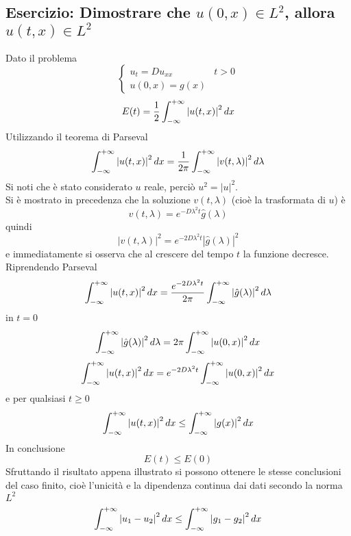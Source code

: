 \subsection{\texorpdfstring
{Esercizio: Dimostrare che $u(0,x) \in L^2$, allora $u(t,x) \in L^2$}
{Esercizio: Dimostrare che se u(0,x) \`e a quadrato sommabile,
allora lo \`e anche u(t,x)}}
Dato il problema
\[
	\left\{
	\begin{array}{ll}
		u_t=Du_{xx} & t>0\\
		u(0,x)= g(x)
	\end{array}
	\right.
\]
\[
	E(t)= \frac{1}{2}\int_{- \infty}^{+ \infty} \left| u(t,x)\right|^2 dx
\]
Utilizzando il teorema di Parseval
\[
	\int_{- \infty}^{+ \infty} \left| u(t,x)\right|^2dx
	= \frac{1}{2\pi} \int_{- \infty}^{+ \infty} \left| v(t,\lambda) \right|^2 d\lambda
\]
Si noti che \`e stato considerato $u$ reale, perci\`o $u^2= |u|^2$.\\
Si \`e mostrato in precedenza che la soluzione $v(t,\lambda)$ (cio\`e la
trasformata di $u$) \`e
\[
	v(t,\lambda)= e^{-D\lambda^2 t} \hat{g}(\lambda)
\]
quindi
\[
	\left| v(t,\lambda) \right|^2 = e^{-2D\lambda^2 t}
	\left| \hat{g}(\lambda) \right|^2
\]
e immediatamente si osserva che al crescere del tempo $t$
la funzione decresce.\\
Riprendendo Parseval
\[
	\int_{- \infty}^{+ \infty} \left| u(t,x)\right|^2 dx= \frac{e^{-2D\lambda^2 t}}{2\pi}
	\int_{- \infty}^{+ \infty} \left| \hat{g}(\lambda) \right|^2 d\lambda
\]
in $t=0$
\[
	\int_{- \infty}^{+ \infty} \left| \hat{g}(\lambda) \right|^2 d\lambda=
	2\pi \int_{- \infty}^{+ \infty} \left| u(0,x)\right|^2 dx
\]
\[
	\int_{- \infty}^{+ \infty} \left| u(t,x)\right|^2 dx= e^{-2D\lambda^2 t}
	\int_{- \infty}^{+ \infty} \left| u(0,x)\right|^2 dx
\]
e per qualsiasi $t\geq 0$
\[
	\int_{- \infty}^{+ \infty} \left| u(t,x)\right|^2 dx \leq
	\int_{- \infty}^{+ \infty} \left| g(x) \right|^2 dx
\]
In conclusione
\[
	E(t)\leq E(0)
\]
Sfruttando il risultato appena illustrato si possono ottenere le stesse
conclusioni del caso finito, cio\`e l'unicit\`a e la dipendenza continua
dai dati secondo la norma $L^2$
\[
	\int_{- \infty}^{+ \infty} \left| u_1-u_2 \right|^2 dx
	\leq
	\int_{- \infty}^{+ \infty} \left| g_1 - g_2 \right|^2 dx
\]
